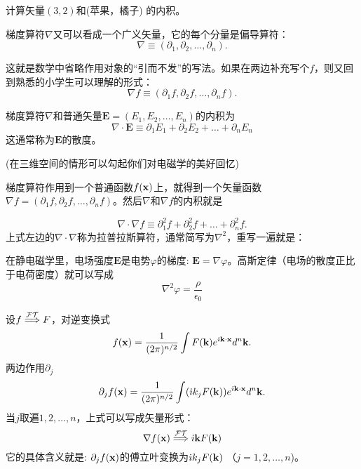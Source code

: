 \documentclass[CJK]{beamer}
\begin{document}
\begin{frame}
  \bch
  
  计算矢量$(3,2)$和(苹果，橘子) 的内积。
  \ech
\end{frame}

\begin{frame}
  \bch
  梯度算符$\nabla$又可以看成一个广义矢量，它的每个分量是偏导算符：
  $$\nabla \equiv (\partial_1, \partial_2,\ldots, \partial_n). $$

  这就是数学中省略作用对象的“引而不发”的写法。如果在两边补充写个$f$，则又回到熟悉的小学生可以理解的形式：
  $$\nabla f \equiv (\partial_1f, \partial_2f,\ldots, \partial_nf). $$
  \ech
\end{frame}

\begin{frame}
  \bch
  梯度算符$\nabla$和普通矢量$\mathbf{E} = (E_1, E_2, \ldots, E_n)$的内积为
  $$\nabla\cdot \mathbf{E} \equiv \partial_1 E_1 + \partial_2 E_2 + \ldots + \partial_n E_n $$
  这通常称为$\mathbf{E}$的{\blue 散度}。
  \skipline
  
  (在三维空间的情形可以勾起你们对电磁学的美好回忆\bye)
  \ech
\end{frame}

\begin{frame}
  \bch
  梯度算符作用到一个普通函数$f({\mathbf{x}})$上，就得到一个矢量函数$\nabla f = (\partial_1 f, \partial_2 f, \ldots, \partial_n f)$。然后$\nabla$和$\nabla f$的内积就是
  
  $$ \nabla \cdot \nabla f \equiv \partial_1^2 f + \partial_2^2 f + \ldots + \partial_n^2 f.$$
  上式左边的$\nabla\cdot \nabla$称为{\blue 拉普拉斯算符}，通常简写为{\blue $\nabla^2$}，重写一遍就是：
  
  {
    \small
  在静电磁学里，电场强度$\mathbf{E}$是电势$\varphi$的梯度: $\mathbf{E} = \nabla \varphi$。高斯定律（电场的散度正比于电荷密度）就可以写成
  $$ \nabla^2 \varphi = \frac{\rho}{\epsilon_0} $$}
  
  \ech
\end{frame}


\begin{frame}
  \chtitle{$\nabla \rightarrow \ii \veck$}
  \bch
  设$f \stackrel{\mathcal{FT}}{\Longrightarrow} F $，对逆变换式
  $$ f({\mathbf{x}}) = \frac{1}{(2\pi)^{n/2}}\int F({\mathbf{k}}) e^{{\dot{\imath}} {\mathbf{k}} \cdot {\mathbf{x}}} d^n{\mathbf{k}}. $$
  两边作用$\partial_j$
  $$ \partial_j f({\mathbf{x}}) =  \frac{1}{(2\pi)^{n/2}}\int ({\dot{\imath}} k_j F({\mathbf{k}})) e^{{\dot{\imath}} {\mathbf{k}} \cdot {\mathbf{x}}} d^n{\mathbf{k}}. $$
  当$j$取遍$1,2,\ldots, n$，上式可以写成矢量形式：
{\blue  $$ \nabla f({\mathbf{x}}) \stackrel{\mathcal{FT}}{\Longrightarrow} {\dot{\imath}} {\mathbf{k}} F({\mathbf{k}}) $$}
  它的具体含义就是: $\partial_jf({\mathbf{x}})$的傅立叶变换为$ {\dot{\imath}} k_j F({\mathbf{k}})$ （$j=1,2,\ldots, n$)。
  \ech
\end{frame}
\end{document}
